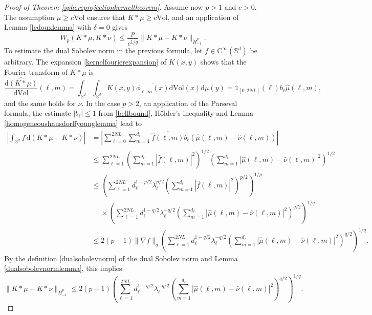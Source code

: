 \documentclass[11pt,a4paper]{article}
\theoremstyle{definition}
\begin{document}
\begin{proof}[Proof of Theorem \ref{sphereprojectionkerneltheorem}]
Assume now $p>1$ and $c>0$. The assumption $\mu \ge c \mathrm{Vol}$ ensures that $K*\mu \ge c \mathrm{Vol}$, and an application of Lemma \ref{ledouxlemma} with $\delta=0$ gives
\begin{equation}\label{spherestep2}
W_p(K*\mu, K*\nu) \le \frac{p}{c^{1/q}} \| K*\mu - K*\nu \|_{\dot{H}_{-1}^p} .
\end{equation}
To estimate the dual Sobolev norm in the previous formula, let $f\in \mathrm{C}^{\infty}(\mathbb{S}^d)$ be arbitrary. The expansion \eqref{kernelfourierexpansion} of $K(x,y)$ shows that the Fourier transform of $K*\mu$ is
\[ \widehat{\frac{\mathrm{d} (K*\mu)}{\mathrm{d}\mathrm{Vol}}}(\ell, m) = \int_{\mathbb{S}^d} \int_{\mathbb{S}^d} K(x,y) \overline{\phi_{\ell,m}(x)} \mathrm{d}\mathrm{Vol}(x) \mathrm{d}\mu(y) = \mathds{1}_{[0,2NL]}(\ell) b_{\ell} \widehat{\mu}(\ell,m) , \]
and the same holds for $\nu$. In the case $p>2$, an application of the Parseval formula, the estimate $|b_{\ell}| \le 1$ from \eqref{bellbound}, H\"older's inequality and Lemma \ref{homogeneoushausdorffyounglemma} lead to
\[ \begin{split} \left| \int_{\mathbb{S}^d} f \, \mathrm{d}(K*\mu - K*\nu) \right| &= \left| \sum_{\ell=0}^{2NL} \sum_{m=1}^{d_{\ell}} \overline{\widehat{f}(\ell,m)} b_{\ell} (\widehat{\mu}(\ell,m) - \widehat{\nu}(\ell,m)) \right| \\ &\le \sum_{\ell=1}^{2NL} \left( \sum_{m=1}^{d_{\ell}} |\widehat{f}(\ell,m)|^2 \right)^{1/2} \left( \sum_{m=1}^{d_{\ell}} |\widehat{\mu}(\ell,m) - \widehat{\nu}(\ell,m)|^2 \right)^{1/2} \\ &\le \left( \sum_{\ell=1}^{2NL} d_{\ell}^{1-p/2} \lambda_{\ell}^{p/2} \left( \sum_{m=1}^{d_{\ell}} |\widehat{f}(\ell,m)|^2 \right)^{p/2} \right)^{1/p} \\ &{\phantom{\le}} \times \left( \sum_{\ell=1}^{2NL} d_{\ell}^{1-q/2} \lambda_{\ell}^{-q/2} \left( \sum_{m=1}^{d_{\ell}} |\widehat{\mu}(\ell,m) - \widehat{\nu}(\ell,m)|^2 \right)^{q/2} \right)^{1/q} \\ &\le 2(p-1) \| \nabla f \|_q \left( \sum_{\ell=1}^{2NL} d_{\ell}^{1-q/2} \lambda_{\ell}^{-q/2} \left( \sum_{m=1}^{d_{\ell}} |\widehat{\mu}(\ell,m) - \widehat{\nu}(\ell,m)|^2 \right)^{q/2} \right)^{1/q} . \end{split} \]
By the definition \eqref{dualsobolevnorm} of the dual Sobolev norm and Lemma \ref{dualsobolevnormlemma}, this implies
\begin{equation}\label{spherestep3}
\| K*\mu - K*\nu \|_{\dot{H}_{-1}^p} \le 2(p-1) \left( \sum_{\ell=1}^{2NL} d_{\ell}^{1-q/2} \lambda_{\ell}^{-q/2} \left( \sum_{m=1}^{d_{\ell}} |\widehat{\mu}(\ell,m) - \widehat{\nu}(\ell,m)|^2 \right)^{q/2} \right)^{1/q} .

\end{equation}
\end{proof}
\end{document}
